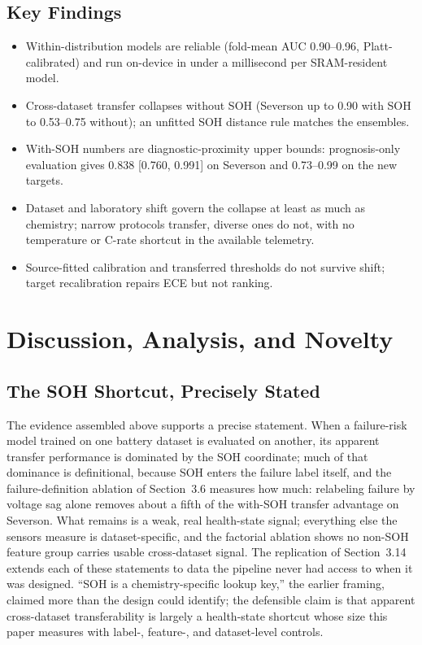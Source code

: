 \documentclass[preprint,12pt]{elsarticle}
\begin{document}
\subsection{Key Findings}
\begin{itemize}
\item Within-distribution models are reliable (fold-mean AUC 0.90--0.96, Platt-calibrated) and run on-device in under a millisecond per SRAM-resident model.
\item Cross-dataset transfer collapses without SOH (Severson up to 0.90 with SOH to 0.53--0.75 without); an unfitted SOH distance rule matches the ensembles.
\item With-SOH numbers are diagnostic-proximity upper bounds: prognosis-only evaluation gives 0.838 [0.760, 0.991] on Severson and 0.73--0.99 on the new targets.
\item Dataset and laboratory shift govern the collapse at least as much as chemistry; narrow protocols transfer, diverse ones do not, with no temperature or C-rate shortcut in the available telemetry.
\item Source-fitted calibration and transferred thresholds do not survive shift; target recalibration repairs ECE but not ranking.
\end{itemize}

\section{Discussion, Analysis, and Novelty}

\subsection{The SOH Shortcut, Precisely Stated}
The evidence assembled above supports a precise statement. When a failure-risk model trained on one battery dataset is evaluated on another, its apparent transfer performance is dominated by the SOH coordinate; much of that dominance is definitional, because SOH enters the failure label itself, and the failure-definition ablation of Section~3.6 measures how much: relabeling failure by voltage sag alone removes about a fifth of the with-SOH transfer advantage on Severson. What remains is a weak, real health-state signal; everything else the sensors measure is dataset-specific, and the factorial ablation shows no non-SOH feature group carries usable cross-dataset signal. The replication of Section~3.14 extends each of these statements to data the pipeline never had access to when it was designed. ``SOH is a chemistry-specific lookup key,'' the earlier framing, claimed more than the design could identify; the defensible claim is that apparent cross-dataset transferability is largely a health-state shortcut whose size this paper measures with label-, feature-, and dataset-level controls.
\end{document}
